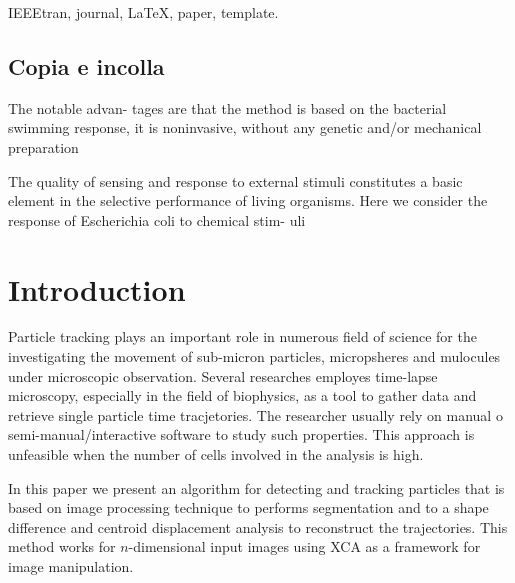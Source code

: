 \documentclass[conference]{IEEEtran}
\begin{document}
\maketitle


\begin{abstract}
\lipsum[1-1]
\end{abstract}

\begin{IEEEkeywords}
IEEEtran, journal, \LaTeX, paper, template.
\end{IEEEkeywords}






%
\IEEEpeerreviewmaketitle

\subsection{Copia e incolla}
The notable advan-
tages are that the method is based on the bacterial swimming
response, it is noninvasive, without any genetic and/or mechanical
preparation

The quality of sensing and response to external stimuli constitutes
a basic element in the selective performance of living organisms.
Here we consider the response of Escherichia coli to chemical stim-
uli
\section{Introduction}
Particle tracking plays an important role in numerous field of science for the investigating the movement of sub-micron particles, micropsheres and mulocules under microscopic observation.  Several researches employes time-lapse microscopy, especially in the field of biophysics, as a tool to gather data and retrieve single particle time tracjetories. The researcher usually rely on manual o semi-manual/interactive software to study such properties. This approach is unfeasible when the number of cells involved in the analysis is high.

In this paper we present an algorithm for detecting and tracking particles that is based on image processing technique to performs segmentation and to a shape difference and centroid displacement analysis to reconstruct the trajectories. This method works for $n$-dimensional input images using XCA as a framework for image manipulation.
\end{document}

